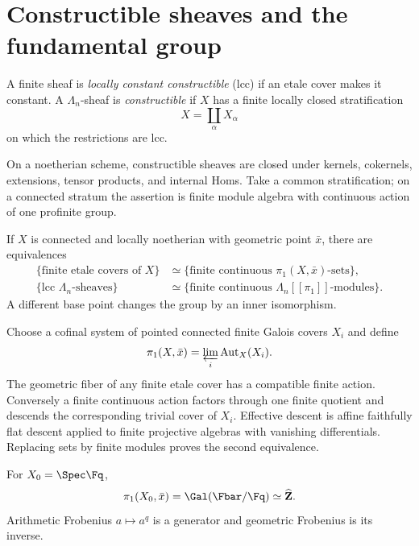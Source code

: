 \section{Constructible sheaves and the fundamental group}

\begin{definition}
A finite sheaf is \emph{locally constant constructible} (lcc) if an etale
cover makes it constant.  A \(\Lambda_n\)-sheaf is \emph{constructible} if
\(X\) has a finite locally closed stratification
\[
 X=\coprod_\alpha X_\alpha
\]
on which the restrictions are lcc.
\end{definition}

On a noetherian scheme, constructible sheaves are closed under kernels,
cokernels, extensions, tensor products, and internal Homs.  Take a common
stratification; on a connected stratum the assertion is finite module algebra
with continuous action of one profinite group.

\begin{theorem}
\label{thm:lcc-pi1}
If \(X\) is connected and locally noetherian with geometric point \(\bar x\),
there are equivalences
\[
\begin{split}
\{\text{finite etale covers of }X\}
  &\simeq\{\text{finite continuous }\pi_1(X,\bar x)\text{-sets}\},\\
\{\text{lcc }\Lambda_n\text{-sheaves}\}
  &\simeq\{\text{finite continuous }\Lambda_n[\![\pi_1]\!]\text{-modules}\}.
\end{split}
\]
A different base point changes the group by an inner isomorphism.
\end{theorem}

\begin{foundation}
Choose a cofinal system of pointed connected finite Galois covers \(X_i\) and
define
\[
 \pi_1(X,\bar x)=\varprojlim_i\operatorname{Aut}_X(X_i).
\]
The geometric fiber of any finite etale cover has a compatible finite action.
Conversely a finite continuous action factors through one finite quotient and
descends the corresponding trivial cover of \(X_i\).  Effective descent is
affine faithfully flat descent applied to finite projective algebras with
vanishing differentials.  Replacing sets by finite modules proves the second
equivalence.
\end{foundation}

For \(X_0=\Spec\Fq\),
\[
 \pi_1(X_0,\bar x)=\Gal(\Fbar/\Fq)\simeq\widehat{\mathbf Z}.
\]
Arithmetic Frobenius \(a\mapsto a^q\) is a generator and geometric Frobenius
is its inverse.

